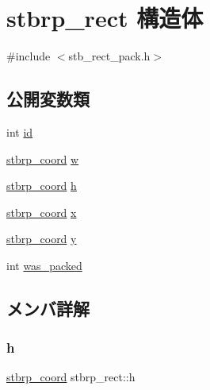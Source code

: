 \hypertarget{structstbrp__rect}{}\section{stbrp\+\_\+rect 構造体}
\label{structstbrp__rect}


{\ttfamily \#include $<$stb\+\_\+rect\+\_\+pack.\+h$>$}

\subsection*{公開変数類}
\begin{DoxyCompactItemize}
\item 
int \mbox{\hyperlink{structstbrp__rect_a92da8626bc99df041c0c3bfd01c25f7a}{id}}
\item 
\mbox{\hyperlink{stb__rect__pack_8h_ac2c2491b95dea6a298b7423dc762dfd9}{stbrp\+\_\+coord}} \mbox{\hyperlink{structstbrp__rect_a248d43f1eb979c1e7b92ba6df431dec5}{w}}
\item 
\mbox{\hyperlink{stb__rect__pack_8h_ac2c2491b95dea6a298b7423dc762dfd9}{stbrp\+\_\+coord}} \mbox{\hyperlink{structstbrp__rect_af68de2dadc7972b7c089d5e0c0558398}{h}}
\item 
\mbox{\hyperlink{stb__rect__pack_8h_ac2c2491b95dea6a298b7423dc762dfd9}{stbrp\+\_\+coord}} \mbox{\hyperlink{structstbrp__rect_a4cc623a3e29f0bc0d3375f6645c84d18}{x}}
\item 
\mbox{\hyperlink{stb__rect__pack_8h_ac2c2491b95dea6a298b7423dc762dfd9}{stbrp\+\_\+coord}} \mbox{\hyperlink{structstbrp__rect_ae3034c1fbf86043b568f5a4dddf946fa}{y}}
\item 
int \mbox{\hyperlink{structstbrp__rect_a74ba347755ce17f2f8a2ea66c612af49}{was\+\_\+packed}}
\end{DoxyCompactItemize}


\subsection{メンバ詳解}
\mbox{\label{structstbrp__rect_af68de2dadc7972b7c089d5e0c0558398}} 
\subsubsection{\texorpdfstring{h}{h}}
{\footnotesize\ttfamily \mbox{\hyperlink{stb__rect__pack_8h_ac2c2491b95dea6a298b7423dc762dfd9}{stbrp\+\_\+coord}} stbrp\+\_\+rect\+::h}

